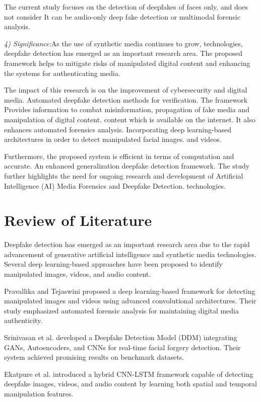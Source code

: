 \documentclass[conference]{IEEEtran}
\begin{document}
The current study focuses on the detection of deepfakes of faces only, and does not consider
It can be audio-only deep fake detection or multimodal forensic analysis.

\textit{4) Significance:}As the use of synthetic media continues to grow,
technologies, deepfake detection has emerged as an important research area. The
proposed framework helps to mitigate risks of manipulated
digital content and enhancing the systems for authenticating media.

The impact of this research is on the improvement of cybersecurity and digital media.
Automated deepfake detection methods for verification. The framework
Provides information to combat misinformation, propagation of fake media and manipulation of digital content.
content which is available on the internet. It also enhances automated forensics analysis.
Incorporating deep learning-based architectures in order to detect manipulated facial images.
and videos.

Furthermore, the proposed system is efficient in terms of computation and accurate.
An enhanced generalization deepfake detection framework. The study
further highlights the need for ongoing research and development of
Artificial Intelligence (AI) Media Forensics and Deepfake Detection.
technologies.


\section{Review of Literature}

Deepfake detection has emerged as an important research area due to the rapid advancement of generative artificial intelligence and synthetic media technologies. Several deep learning-based approaches have been proposed to identify manipulated images, videos, and audio content.

Pravallika and Tejaswini \cite{b1} proposed a deep learning-based framework for detecting manipulated images and videos using advanced convolutional architectures. Their study emphasized automated forensic analysis for maintaining digital media authenticity.

Srinivasan et al. \cite{b2} developed a Deepfake Detection Model (DDM) integrating GANs, Autoencoders, and CNNs for real-time facial forgery detection. Their system achieved promising results on benchmark datasets.

Ekatpure et al. \cite{b3} introduced a hybrid CNN-LSTM framework capable of detecting deepfake images, videos, and audio content by learning both spatial and temporal manipulation features.
\end{document}
